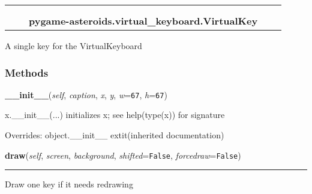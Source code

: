     \label{pygame-asteroids:virtual_keyboard:VirtualKey}
\begin{tabular}{cccccc}
\multicolumn{2}{r}{\settowidth{\BCL}{object}\multirow{2}{\BCL}{object}}
&&
  \\\cline{3-3}
  &&\multicolumn{1}{c|}{}
&&
  \\
&&\multicolumn{2}{l}{\textbf{pygame-asteroids.virtual\_keyboard.VirtualKey}}
\end{tabular}

A single key for the VirtualKeyboard



  \subsubsection{Methods}

    \vspace{0.5ex}

\hspace{.8\funcindent}\begin{boxedminipage}{\funcwidth}

    \raggedright \textbf{\_\_init\_\_}(\textit{self}, \textit{caption}, \textit{x}, \textit{y}, \textit{w}={\tt 67}, \textit{h}={\tt 67})

\setlength{\parskip}{2ex}
    x.\_\_init\_\_(...) initializes x; see help(type(x)) for signature

\setlength{\parskip}{1ex}
      Overrides: object.\_\_init\_\_ 	extit{(inherited documentation)}

    \end{boxedminipage}

    \label{pygame-asteroids:virtual_keyboard:VirtualKey:draw}

    \vspace{0.5ex}

\hspace{.8\funcindent}\begin{boxedminipage}{\funcwidth}

    \raggedright \textbf{draw}(\textit{self}, \textit{screen}, \textit{background}, \textit{shifted}={\tt False}, \textit{forcedraw}={\tt False})

    \vspace{-1.5ex}

    \rule{\textwidth}{0.5\fboxrule}
\setlength{\parskip}{2ex}
    Draw one key if it needs redrawing

\setlength{\parskip}{1ex}
    \end{boxedminipage}


